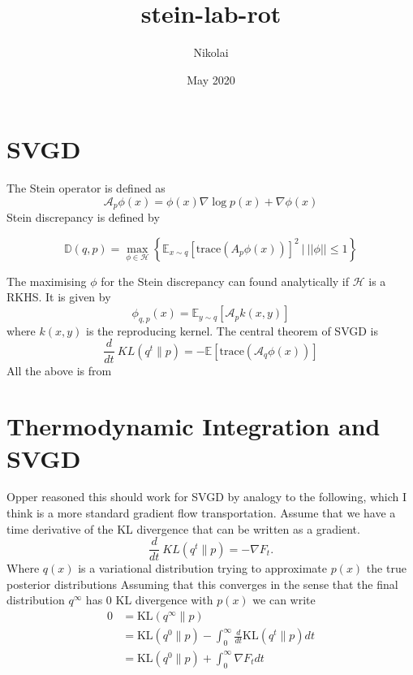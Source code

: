 \documentclass{article}
\title{stein-lab-rot}
\author{Nikolai }
\date{May 2020}
\begin{document}
\maketitle

\section{SVGD}
The Stein operator is defined as
\begin{equation}
    \label{eq:stein_operator}
    \mathcal{A}_p \phi(x) = \phi(x) \nabla \log p(x) + \nabla \phi(x)
\end{equation}
Stein discrepancy is defined by

\begin{equation}
    \label{eq:stein_discrepancy}
    \mathbb{D}( q, p ) = \max_{ \phi \in \mathcal{H} } 
    \left\{ 
      \mathbb{E}_{ x \sim q } 
        \left[ 
            \text{trace} ( A_p \phi(x) ) 
        \right]^2
        \ | \ ||\phi|| \leq 1 
    \right\}
\end{equation}

The maximising $\phi$ for the Stein discrepancy can found analytically if $\mathcal{H}$ is a RKHS. It is given by
\begin{equation}
    \label{eq:phi_max}
    \phi_{ q, p } (x) = \mathbb{E}_{ y \sim q } \left[ \mathcal{A}_p k(x, y) \right]
\end{equation}
where $k(x,y)$ is the reproducing kernel.
The central theorem of SVGD is
\begin{equation}
    \label{eq:svgd}
    \frac{d}{dt}\ KL( q^t \| p ) = - \mathbb{E} \left[ \text{trace} \left( \mathcal{A}_q \phi(x) \right) \right]
\end{equation}
All the above is from \cite{svgd}


\section{Thermodynamic Integration and SVGD}
Opper reasoned this should work for SVGD by analogy to the following, which I think is a more standard gradient
flow transportation. Assume that we have a time derivative of the KL divergence that can be written as a gradient.
\begin{equation}
    \frac{d}{dt}\ KL( q^t \| p ) = - \nabla F_t.
\end{equation}
Where $q(x)$ is a variational distribution trying to approximate $p(x)$ the true posterior distributions
Assuming that this converges in the sense that the final distribution $q^{\infty}$ has 0 KL divergence with 
$p(x)$ we can write
\begin{align}
\label{eq:therm_int}
0 &= \text{KL}( q^{\infty} \| p ) \\
&= \text{KL} ( q^0 \| p ) - \int_0^{\infty} \frac{d}{dt} \text{KL} ( q^t \| p ) dt \\
&= \text{KL}( q^0 \| p ) + \int_0^{\infty} \nabla F_t dt
\end{align}
\end{document}

